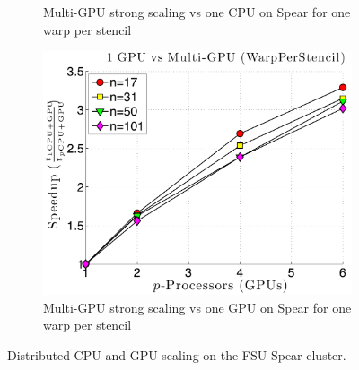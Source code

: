 \begin{figure}
\begin{subfigure}[t]{0.425\textwidth}
\caption{Multi-GPU strong scaling vs one CPU on Spear for one warp per stencil}
\label{fig:spear_alltoall_multigpu_vs_cpu_scaling}
\end{subfigure} 
\begin{subfigure}[t]{0.425\textwidth}
\centering
\includegraphics[width=1.0\textwidth]{../figures/spear_results/alltoallv_vortex/speedup_1GPU_vs_NGPU_WarpPerStencil.pdf}
\caption{Multi-GPU strong scaling vs one GPU on Spear for one warp per stencil}
\label{fig:spear_alltoall_multigpu_vs_gpu_scaling}
\end{subfigure} 
\caption{Distributed CPU and GPU scaling on the FSU Spear cluster.}
\end{figure} 



